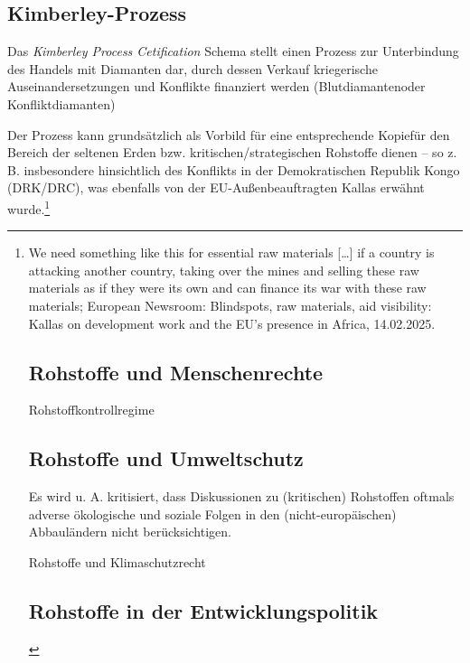 \documentclass[12pt,a4paper,oneside]{book} %
\begin{document}
	\subsection{Kimberley-Prozess}
	Das \textit{Kimberley Process Cetification} Schema stellt einen Prozess zur Unterbindung des Handels mit Diamanten dar, durch dessen Verkauf kriegerische Auseinandersetzungen und Konflikte finanziert werden (\glqq Blutdiamanten\grqq oder Konfliktdiamanten)
	
	
	Der Prozess kann grundsätzlich als Vorbild für eine entsprechende \glqq Kopie\grqq für den Bereich der seltenen Erden bzw. kritischen/strategischen Rohstoffe dienen -- so z. B. insbesondere hinsichtlich des Konflikts in der Demokratischen Republik Kongo (DRK/DRC), was ebenfalls von der EU-Außenbeauftragten Kallas erwähnt wurde.\footnote{\glqq We need something like this for essential raw materials […] if a country is attacking another country, taking over the mines and selling these raw materials as if they were its own and can finance its war with these raw materials\grqq; European Newsroom: Blindspots, raw materials, aid visibility: Kallas on development work and the EU’s presence in Africa, 14.02.2025. %
	
	
		
	
	\section{Rohstoffe und Menschenrechte}
	
	Rohstoffkontrollregime
	
	\section{Rohstoffe und Umweltschutz}
	
	Es wird u. A. kritisiert, dass Diskussionen zu (kritischen) Rohstoffen oftmals adverse ökologische und soziale Folgen in den (nicht-europäischen) Abbauländern nicht berücksichtigen.\autocite[15]{Kueblboeck_2023}
	
	Rohstoffe und Klimaschutzrecht
	
	
	\section{Rohstoffe in der Entwicklungspolitik}
	
}
\end{document}
